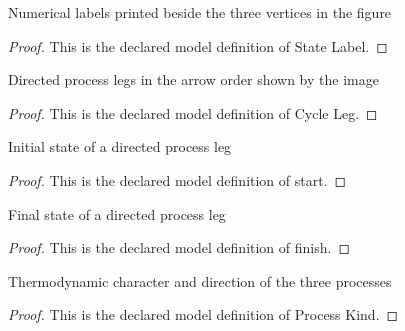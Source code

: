 \begin{definition}
  \label{def:physics:phyx-mini-0482:phyxminiproblems-problemphyxmini0482-statelabel}
  Numerical labels printed beside the three vertices in the figure
\end{definition}
\begin{proof}
  This is the declared model definition of State Label.
\end{proof}
\begin{definition}
  \label{def:physics:phyx-mini-0482:phyxminiproblems-problemphyxmini0482-cycleleg}
  Directed process legs in the arrow order shown by the image
\end{definition}
\begin{proof}
  This is the declared model definition of Cycle Leg.
\end{proof}
\begin{definition}[start]
  \label{def:physics:phyx-mini-0482:phyxminiproblems-problemphyxmini0482-cycleleg-start}
  Initial state of a directed process leg
\end{definition}
\begin{proof}
  This is the declared model definition of start.
\end{proof}
\begin{definition}[finish]
  \label{def:physics:phyx-mini-0482:phyxminiproblems-problemphyxmini0482-cycleleg-finish}
  Final state of a directed process leg
\end{definition}
\begin{proof}
  This is the declared model definition of finish.
\end{proof}
\begin{definition}
  \label{def:physics:phyx-mini-0482:phyxminiproblems-problemphyxmini0482-processkind}
  Thermodynamic character and direction of the three processes
\end{definition}
\begin{proof}
  This is the declared model definition of Process Kind.
\end{proof}

